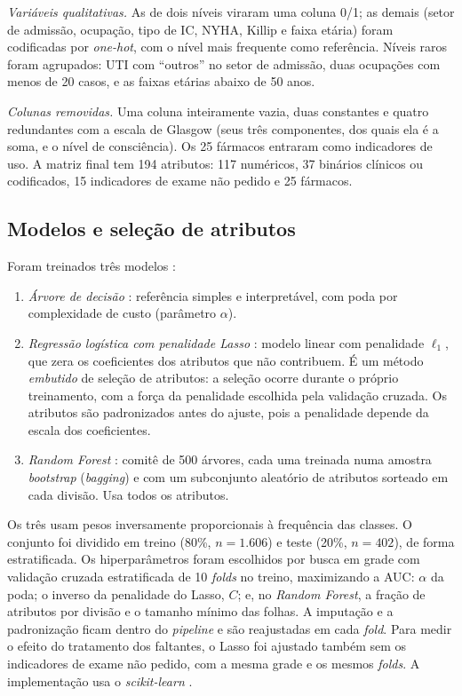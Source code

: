 \documentclass[conference]{IEEEtran}
\begin{document}
\textit{Variáveis qualitativas.} As de dois níveis viraram uma coluna 0/1; as demais (setor de admissão, ocupação, tipo de IC, NYHA, Killip e faixa etária) foram codificadas por \textit{one-hot}, com o nível mais frequente como referência. Níveis raros foram agrupados: UTI com ``outros'' no setor de admissão, duas ocupações com menos de 20 casos, e as faixas etárias abaixo de 50 anos.

\textit{Colunas removidas.} Uma coluna inteiramente vazia, duas constantes e quatro redundantes com a escala de Glasgow (seus três componentes, dos quais ela é a soma, e o nível de consciência). Os 25 fármacos entraram como indicadores de uso. A matriz final tem 194 atributos: 117 numéricos, 37 binários clínicos ou codificados, 15 indicadores de exame não pedido e 25 fármacos.

\subsection{Modelos e seleção de atributos}

Foram treinados três modelos \cite{b5}:
\begin{enumerate}
\item \textit{Árvore de decisão} \cite{b13}: referência simples e interpretável, com poda por complexidade de custo (parâmetro $\alpha$).
\item \textit{Regressão logística com penalidade Lasso} \cite{b12}: modelo linear com penalidade $\ell_1$, que zera os coeficientes dos atributos que não contribuem. É um método \textit{embutido} de seleção de atributos: a seleção ocorre durante o próprio treinamento, com a força da penalidade escolhida pela validação cruzada. Os atributos são padronizados antes do ajuste, pois a penalidade depende da escala dos coeficientes.
\item \textit{Random Forest} \cite{b14}: comitê de 500 árvores, cada uma treinada numa amostra \textit{bootstrap} (\textit{bagging}) e com um subconjunto aleatório de atributos sorteado em cada divisão. Usa todos os atributos.
\end{enumerate}

Os três usam pesos inversamente proporcionais à frequência das classes. O conjunto foi dividido em treino (80\%, $n = 1.606$) e teste (20\%, $n = 402$), de forma estratificada. Os hiperparâmetros foram escolhidos por busca em grade com validação cruzada estratificada de 10 \textit{folds} no treino, maximizando a AUC: $\alpha$ da poda; o inverso da penalidade do Lasso, $C$; e, no \textit{Random Forest}, a fração de atributos por divisão e o tamanho mínimo das folhas. A imputação e a padronização ficam dentro do \textit{pipeline} e são reajustadas em cada \textit{fold}. Para medir o efeito do tratamento dos faltantes, o Lasso foi ajustado também sem os indicadores de exame não pedido, com a mesma grade e os mesmos \textit{folds}. A implementação usa o \textit{scikit-learn} \cite{b15}.
\end{document}
